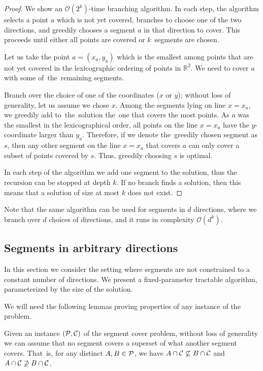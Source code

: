 \begin{proof}
We show an $\mathcal{O}(2^k)$-time branching algorithm.
In each step, the algorithm selects a point $a$ which is not yet covered,
branches to choose one of the two directions, and greedily chooses
a segment $a$ in that direction to cover.
This proceeds until either all points are covered or $k$~segments are chosen.

Let us take
the point $a=(x_a,y_a)$ which is the smallest 
among points that are not yet covered
in the lexicographic ordering
of points in $\mathbb{R}^2$.
We need to cover $a$ with some of~the~remaining segments.

Branch over the choice of one of the coordinates ($x$ or $y$);
without loss of generality, let us assume we chose $x$.
Among the segments lying on line $x = x_a$,
we greedily add to~the~solution the~one that covers the most points.
As $a$ was the smallest in the lexicographical order,
all points on the line $x = x_a$ have the $y$-coordinate larger than $y_a$.
Therefore, if we denote the~greedily chosen segment as $s$,
then any other segment on the line $x = x_a$ that covers $a$ can only
cover a subset of points covered by $s$.
Thus, greedily choosing $s$ is optimal.

In each step of the algorithm we add one segment to the solution,
thus the recursion can be stopped at depth $k$.
If no branch finds a solution, then this means
that a solution of size at most $k$ does not exist.
\end{proof}

Note that the same algorithm can be used for segments in $d$ directions,
where we branch over $d$ choices of directions, and it runs in complexity $\mathcal{O}(d^k)$.

\subsection{Segments in arbitrary directions}
\label{segments_in_arbitrary_direction}
In this section we consider the setting where segments are not constrained
to a constant number of directions. 
We present a fixed-parameter tractable algorithm,
parameterized by the size of the solution.

\segmentCoverFpt*

We will need the following lemmas proving properties of any
instance of the problem.

\begin{lemma}
   \label{fpt_reduction}
   Given an instance $(\mathcal{P}, \mathcal{C})$ of the segment cover problem,
   without loss of generality we can assume that
   no segment covers a superset of what another segment covers.
   That~is, for any distinct $A, B \in \mathcal{P}$, we have
   $A \cap \mathcal{C} \not \subseteq B \cap \mathcal{C}$ and $A \cap \mathcal{C} \not \supseteq B \cap \mathcal{C}$.
\end{lemma}   
   
